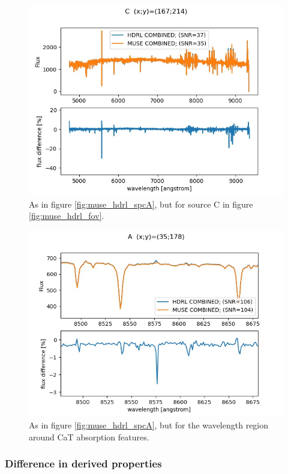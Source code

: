 \begin{figure}[H]
\centering
\includegraphics[width=12cm]{figures/spc_C.jpg}
\caption[] {\footnotesize As in figure \ref{fig:muse_hdrl_spcA}, but for source C in figure \ref{fig:muse_hdrl_fov}.}
	\label{fig:muse_hdrl_spcC}
\end{figure}

\begin{figure}[H]
\centering
\includegraphics[width=12cm]{figures/line_shape.jpg}
\caption[] {\footnotesize As in figure \ref{fig:muse_hdrl_spcA}, but for the wavelength region around CaT absorption features.}
	\label{fig:muse_hdrl_profile}
\end{figure}


\subsubsection{Difference in derived properties}

